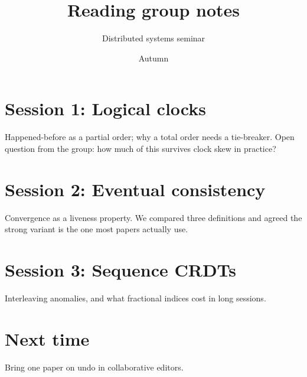 \documentclass[11pt]{article}
\title{Reading group notes}
\author{Distributed systems seminar}
\date{Autumn}
\begin{document}
\maketitle

\section*{Session 1: Logical clocks}
Happened-before as a partial order; why a total order needs a tie-breaker.
Open question from the group: how much of this survives clock skew in practice?

\section*{Session 2: Eventual consistency}
Convergence as a liveness property. We compared three definitions and agreed
the strong variant is the one most papers actually use.

\section*{Session 3: Sequence CRDTs}
Interleaving anomalies, and what fractional indices cost in long sessions.

\section*{Next time}
Bring one paper on undo in collaborative editors.
\end{document}
